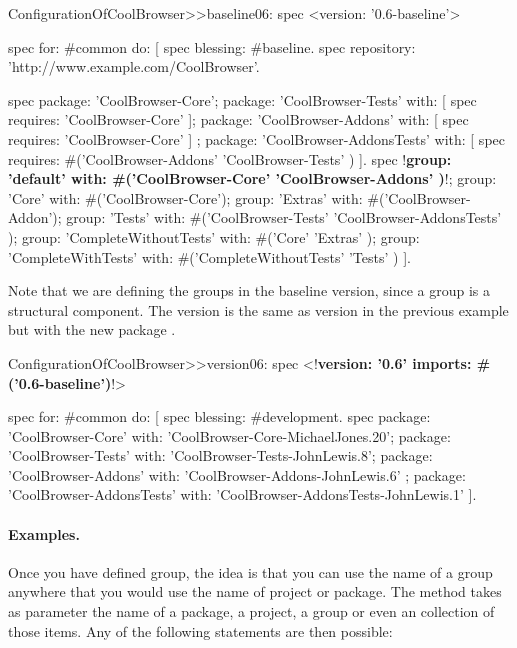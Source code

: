 \documentclass[a4paper,10pt,twoside]{book}
\begin{document}
\begin{code}{}
ConfigurationOfCoolBrowser>>baseline06: spec 
       <version: '0.6-baseline'>
       
       spec for: #common do: [
              spec blessing: #baseline.
              spec repository: 'http://www.example.com/CoolBrowser'.
              
              spec 
                     package: 'CoolBrowser-Core';
                     package: 'CoolBrowser-Tests' with: [ spec requires: 'CoolBrowser-Core' ];
                     package: 'CoolBrowser-Addons' with: [ spec requires: 'CoolBrowser-Core' ] ;
                     package: 'CoolBrowser-AddonsTests' with: [ 
                            spec requires: #('CoolBrowser-Addons' 'CoolBrowser-Tests' ) ].
              spec 
                     !\textbf{group: 'default' with: \#('CoolBrowser-Core' 'CoolBrowser-Addons' )}!;
                     group: 'Core' with: #('CoolBrowser-Core');
                     group: 'Extras' with: #('CoolBrowser-Addon');
                     group: 'Tests' with: #('CoolBrowser-Tests' 'CoolBrowser-AddonsTests' );
                     group: 'CompleteWithoutTests' with: #('Core' 'Extras' );
                     group: 'CompleteWithTests' with: #('CompleteWithoutTests' 'Tests' )
               ].
\end{code}






 
Note that we are defining the groups in the baseline version, since a group is a structural component. The version  is the same as version in the previous example but with the new package .
 
\begin{code}{}
ConfigurationOfCoolBrowser>>version06: spec 
       <!\textbf{version: '0.6' imports: \#('0.6-baseline')}!>
       
       spec for: #common do: [
              spec blessing: #development.
              spec 
                     package: 'CoolBrowser-Core' with: 'CoolBrowser-Core-MichaelJones.20';
                     package: 'CoolBrowser-Tests' with: 'CoolBrowser-Tests-JohnLewis.8';
                     package: 'CoolBrowser-Addons' with: 'CoolBrowser-Addons-JohnLewis.6' ;
                     package: 'CoolBrowser-AddonsTests' with: 'CoolBrowser-AddonsTests-JohnLewis.1' ].
\end{code}
 

\paragraph{Examples.} Once you have defined group, the idea is that you can use the name of a group anywhere that you would use the name of project or package. The   method takes as parameter the name of a package, a project, a group or even an collection of those items.  Any of the following statements are then possible:
\end{document}
